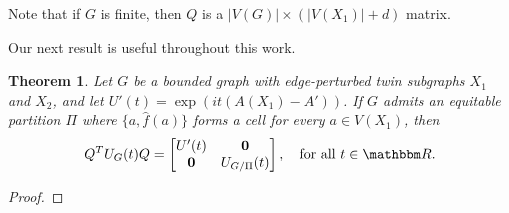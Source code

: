 \documentclass[12pt,a4paper]{article}
\newtheorem{thm}{Theorem}
\def \Rl {{\mathbbm R}}
\def \e {{\bf e}}
\def \e {{\mathbf e}}
\newcommand{\ob}[1]{\left(#1\right)}
\begin{document}
Note that if $G$ is finite, then $Q$ is a $|V(G)|\times(|V(X_1)|+d)$ matrix.

Our next result is useful throughout this work.

\begin{thm}\label{mainthm}
Let $G$ be a bounded graph with edge-perturbed twin subgraphs $X_1$ and $X_2$, and let $U'(t)=\exp{\ob{it\ob{A\ob{X_1}-A'}}}$. If $G$ admits an equitable partition $\Pi$ where $\{a, \hat{f}(a)\}$ forms a cell for every $a\in V(X_1)$, then
\[Q^T U_G(t)Q=\begin{bmatrix}U'(t) & \mathbf{0}\\ \mathbf{0} & U_{G/\Pi}(t) \end{bmatrix},\quad \text{for all $t\in\Rl$}.\]
\end{thm}

\begin{proof}

\end{proof}
\end{document}
